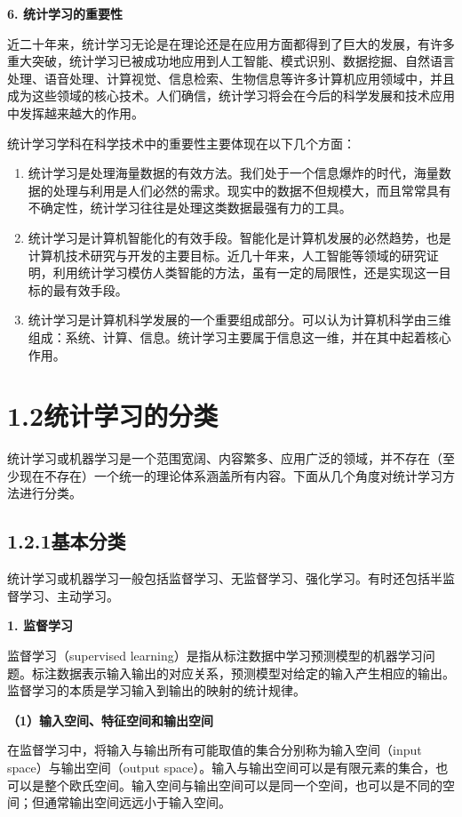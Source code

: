 \documentclass[UTF8,12pt,a4paper,fontset=fandol]{ctexart}
\begin{document}
\noindent\textbf{6. 统计学习的重要性}

近二十年来，统计学习无论是在理论还是在应用方面都得到了巨大的发展，有许多重大突破，统计学习已被成功地应用到人工智能、模式识别、数据挖掘、自然语言处理、语音处理、计算视觉、信息检索、生物信息等许多计算机应用领域中，并且成为这些领域的核心技术。人们确信，统计学习将会在今后的科学发展和技术应用中发挥越来越大的作用。

统计学习学科在科学技术中的重要性主要体现在以下几个方面：
\begin{enumerate}
  \item 统计学习是处理海量数据的有效方法。我们处于一个信息爆炸的时代，海量数据的处理与利用是人们必然的需求。现实中的数据不但规模大，而且常常具有不确定性，统计学习往往是处理这类数据最强有力的工具。
  \item 统计学习是计算机智能化的有效手段。智能化是计算机发展的必然趋势，也是计算机技术研究与开发的主要目标。近几十年来，人工智能等领域的研究证明，利用统计学习模仿人类智能的方法，虽有一定的局限性，还是实现这一目标的最有效手段。
  \item 统计学习是计算机科学发展的一个重要组成部分。可以认为计算机科学由三维组成：系统、计算、信息。统计学习主要属于信息这一维，并在其中起着核心作用。
\end{enumerate}

\section*{1.2\quad 统计学习的分类}

统计学习或机器学习是一个范围宽阔、内容繁多、应用广泛的领域，并不存在（至少现在不存在）一个统一的理论体系涵盖所有内容。下面从几个角度对统计学习方法进行分类。

\subsection*{1.2.1\quad 基本分类}

统计学习或机器学习一般包括监督学习、无监督学习、强化学习。有时还包括半监督学习、主动学习。

\noindent\textbf{1. 监督学习}

监督学习（supervised learning）是指从标注数据中学习预测模型的机器学习问题。标注数据表示输入输出的对应关系，预测模型对给定的输入产生相应的输出。监督学习的本质是学习输入到输出的映射的统计规律。

\noindent\textbf{（1）输入空间、特征空间和输出空间}

在监督学习中，将输入与输出所有可能取值的集合分别称为输入空间（input space）与输出空间（output space）。输入与输出空间可以是有限元素的集合，也可以是整个欧氏空间。输入空间与输出空间可以是同一个空间，也可以是不同的空间；但通常输出空间远远小于输入空间。
\end{document}
